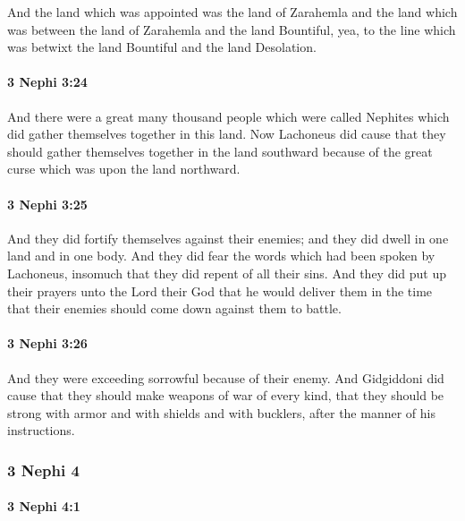 			And the land which was appointed was the land of Zarahemla
			and the land which was between the land of Zarahemla and the land Bountiful,
			yea, to the line which was betwixt the land Bountiful and the land Desolation.

		\paragraph{3 Nephi 3:24} %
			\label{3NEPHI-3-24}

			And there were a great many thousand people which were called Nephites
			which did gather themselves together in this land.
			Now Lachoneus did cause
			that they should gather themselves together in the land southward
			because of the great curse which was upon the land northward.

		\paragraph{3 Nephi 3:25} %
			\label{3NEPHI-3-25}

			And they did fortify themselves against their enemies;
			and they did dwell in one land and in one body.
			And they did fear the words which had been spoken by Lachoneus,
			insomuch that they did repent of all their sins.
			And they did put up their prayers unto the Lord their God
			that he would deliver them
			in the time that their enemies should come down against them to battle.

		\paragraph{3 Nephi 3:26} %
			\label{3NEPHI-3-26}

			And they were exceeding sorrowful because of their enemy.
			And Gidgiddoni did cause that they should make weapons of war of every kind,
			that they should be strong with armor and with shields and with bucklers,
			after the manner of his instructions.

	\subsubsection{3 Nephi 4} %
		\label{3NEPHI-4}
		
		\paragraph{3 Nephi 4:1} %
			\label{3NEPHI-4-1}

